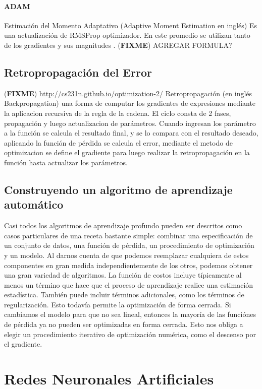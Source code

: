 \documentclass[a4paper,11pt,spanish]{book}
\newcommand*{\FIXME}[1]{{(\textbf{FIXME}) {#1}}}
\begin{document}
	\paragraph{ADAM} Estimación del Momento Adaptativo (Adaptive Moment Estimation en inglés) Es una actualización de RMSProp optimizador. 
	  En este promedio se utilizan tanto de los gradientes y sus magnitudes . \FIXME{AGREGAR FORMULA?}
	
    \subsection{Retropropagación del Error}
      \FIXME{\url{http://cs231n.github.io/optimization-2/}}
      Retropropagación (en inglés Backpropagation) una forma  de computar los gradientes de expresiones mediante la aplicacion recursiva de la regla de la cadena.
      El ciclo consta de 2 fases, propagación y luego actualizacion de parámetros. Cuando ingresan los parámetro a la función se calcula el resultado final, y se lo compara con el resultado 
      deseado, aplicando la función de pérdida se calcula el error, mediante el metodo de optimizacion se define el gradiente para luego realizar la retropropagación en la función hasta 
      actualizar los parámetros.

    \subsection{Construyendo un algoritmo de aprendizaje automático}
      Casi todos los algoritmos de aprendizaje profundo pueden ser descritos como casos particulares de una receta bastante simple: 
      combinar una especificación de un conjunto de datos, una función de pérdida, un procedimiento de optimización y un modelo.
      Al darnos cuenta de que podemos reemplazar cualquiera de estos componentes en gran medida independientemente de los otros, podemos obtener una gran variedad de algoritmos.
      La función de costos incluye típicamente al menos un término que hace que el proceso de aprendizaje realice una estimación estadística. También puede incluir términos adicionales, 
      como los términos de regularización. Esto todavía permite la optimización de forma cerrada. 
      Si cambiamos el modelo para que no sea lineal, entonces la mayoría de las funciónes de pérdida ya no pueden ser optimizadas en forma cerrada. 
      Esto nos obliga a elegir un procedimiento iterativo de optimización numérica, como el descenso por el gradiente.
    
    \section{Redes Neuronales Artificiales}
      
\end{document}
